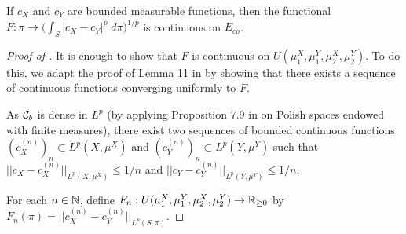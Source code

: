 \begin{lemma} \label{lemma:coot_continuous}
    If $c_X$ and $c_Y$ are bounded measurable functions, then
    the functional $F: \pi \to \Big( \int_{S} \vert c_X - c_Y \vert^p \; d\pi \Big)^{1/p}$ is continuous on $E_{co}$.
\end{lemma}
\begin{proof}[Proof of ]
  It is enough to show that $F$ is continuous on $U(\mu_1^X, \mu_1^Y, \mu_2^X, \mu_2^Y)$.
  To do this, we adapt the proof of Lemma 11 in \citep{Chowdhury19} by showing that
  there exists a sequence of continuous functions converging uniformly to $F$.

  As $\mathcal C_b$ is dense in $L^p$ (by applying Proposition 7.9 in \citep{Folland99}
  on Polish spaces endowed with finite measures), there exist two sequences of
  bounded continuous functions $(c_X^{(n)})_n \subset L^p(X, \mu^X)$ and
  $(c_Y^{(n)})_n \subset L^p(Y, \mu^Y)$ such that
  $\vert\vert c_X - c_X^{(n)} \vert\vert_{L^p(X, \mu^X)} \leq 1/n$ and
  $\vert\vert c_Y - c_Y^{(n)} \vert\vert_{L^p(Y, \mu^Y)} \leq 1/n$.

  For each $n \in \mathbb N$, define $F_n: U(\mu_1^X, \mu_1^Y, \mu_2^X, \mu_2^Y) \to \mathbb R_{\geq 0}$
  by $F_n(\pi) = \vert\vert c_X^{(n)} - c_Y^{(n)} \vert\vert_{L^p(S, \pi)}$.


\end{proof}
